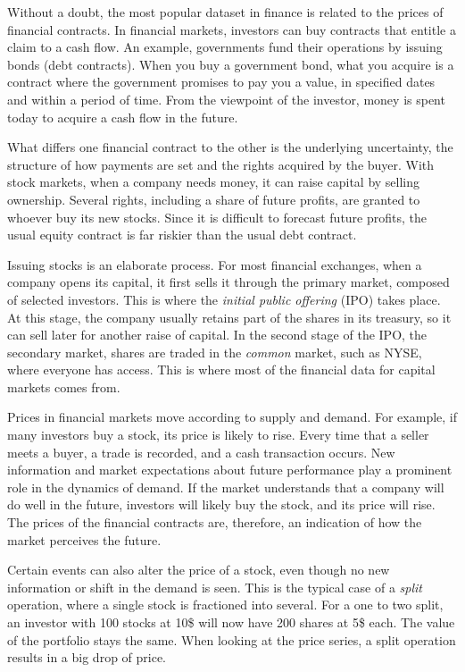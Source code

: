 \documentclass[11pt,]{book}
\begin{document}
Without a doubt, the most popular dataset in finance is related to the
prices of financial contracts. In financial markets, investors can buy
contracts that entitle a claim to a cash flow. An example, governments
fund their operations by issuing bonds (debt contracts). When you buy a
government bond, what you acquire is a contract where the government
promises to pay you a value, in specified dates and within a period of
time. From the viewpoint of the investor, money is spent today to
acquire a cash flow in the future.

What differs one financial contract to the other is the underlying
uncertainty, the structure of how payments are set and the rights
acquired by the buyer. With stock markets, when a company needs money,
it can raise capital by selling ownership. Several rights, including a
share of future profits, are granted to whoever buy its new stocks.
Since it is difficult to forecast future profits, the usual equity
contract is far riskier than the usual debt contract.

Issuing stocks is an elaborate process. For most financial exchanges,
when a company opens its capital, it first sells it through the primary
market, composed of selected investors. This is where the \emph{initial
public offering} (IPO) takes place. At this stage, the company usually
retains part of the shares in its treasury, so it can sell later for
another raise of capital. In the second stage of the IPO, the secondary
market, shares are traded in the \emph{common} market, such as NYSE,
where everyone has access. This is where most of the financial data for
capital markets comes from.

Prices in financial markets move according to supply and demand. For
example, if many investors buy a stock, its price is likely to rise.
Every time that a seller meets a buyer, a trade is recorded, and a cash
transaction occurs. New information and market expectations about future
performance play a prominent role in the dynamics of demand. If the
market understands that a company will do well in the future, investors
will likely buy the stock, and its price will rise. The prices of the
financial contracts are, therefore, an indication of how the market
perceives the future.

Certain events can also alter the price of a stock, even though no new
information or shift in the demand is seen. This is the typical case of
a \emph{split} operation, where a single stock is fractioned into
several. For a one to two split, an investor with 100 stocks at 10\$
will now have 200 shares at 5\$ each. The value of the portfolio stays
the same. When looking at the price series, a split operation results in
a big drop of price.
\end{document}
